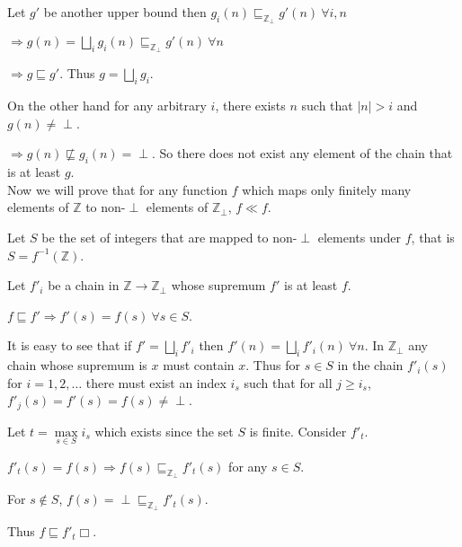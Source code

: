 \begin{enumerate}[(a)]
\begin{enumerate}[i.]
  Let $g'$ be another upper bound then $g_i(n) \sqsubseteq_{\mathbb Z_{\perp}} g'(n) ~\forall i, n $

  $\Rightarrow g(n) = \bigsqcup \limits_{i} g_i(n) \sqsubseteq_{\mathbb Z_{\perp}} g'(n)~\forall n $

  $\Rightarrow g \sqsubseteq g'$. Thus $g = \bigsqcup_i g_i$.

  On the other hand for any arbitrary $i$, there exists $n$ such that $|n| > i$ and $g(n) \neq \perp$.

  $\Rightarrow g(n) \not \sqsubseteq g_i(n) = \perp$. So there does not exist any element of the chain that is at least $g$.\\

  Now we will prove that for any function $f$ which maps only finitely many elements of $\mathbb Z$ to non-$\perp$ elements of $\mathbb Z_{\perp}$, $f \ll f$.

  Let $S$ be the set of integers that are mapped to non-$\perp$ elements under $f$, that is $S = f^{-1}(\mathbb Z)$.


  Let $f'_i$ be a chain in $\mathbb Z \rightarrow \mathbb Z_{\perp}$ whose supremum $f'$ is at least $f$.

  $f \sqsubseteq f' \Rightarrow f'(s) = f(s) ~\forall s \in S$.

  It is easy to see that if $f' = \bigsqcup\limits_i f'_i$ then $f'(n) = \bigsqcup\limits_{i} f'_i(n) ~ \forall n$. In $\mathbb Z_{\perp}$ any chain whose supremum is $x$ must contain $x$. Thus for $s \in S$ in the chain $f'_i(s)$ for $i = 1,2, \ldots$ there must exist an index $i_s$ such that for all $j \geq i_s$, $f'_{j}(s) = f'(s) = f(s) \neq \perp$.

  Let $t = \max \limits_{s\in S} i_s$ which exists since the set $S$ is finite. Consider $f'_t$.

  $f'_t(s) = f(s) \Rightarrow f(s) \sqsubseteq_{\mathbb Z_{\perp}} f'_t(s)$ for any $s \in S$.

  For $s \notin S$, $f(s) = \perp \sqsubseteq_{\mathbb Z_{\perp}} f'_t(s)$.

  Thus $f \sqsubseteq f'_t \Box$.



  \end{enumerate}
\end{enumerate}